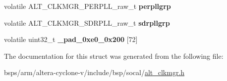 \begin{DoxyCompactItemize}
\item 
\mbox{\label{structALT__CLKMGR__raw__s_ac54bb0c51573daca7e56bfdaf33ef59e}} 
volatile A\+L\+T\+\_\+\+C\+L\+K\+M\+G\+R\+\_\+\+P\+E\+R\+P\+L\+L\+\_\+raw\+\_\+t {\bfseries perpllgrp}
\item 
\mbox{\label{structALT__CLKMGR__raw__s_aebde187779580fa272ce9d153550d0a3}} 
volatile A\+L\+T\+\_\+\+C\+L\+K\+M\+G\+R\+\_\+\+S\+D\+R\+P\+L\+L\+\_\+raw\+\_\+t {\bfseries sdrpllgrp}
\item 
\mbox{\label{structALT__CLKMGR__raw__s_ac63dc144a59053dd04d5cb2cbb04337e}} 
volatile uint32\+\_\+t {\bfseries \+\_\+pad\+\_\+0xe0\+\_\+0x200} \mbox{[}72\mbox{]}
\end{DoxyCompactItemize}


The documentation for this struct was generated from the following file\+:\begin{DoxyCompactItemize}
\item 
bsps/arm/altera-\/cyclone-\/v/include/bsp/socal/\mbox{\hyperlink{alt__clkmgr_8h}{alt\+\_\+clkmgr.\+h}}\end{DoxyCompactItemize}
